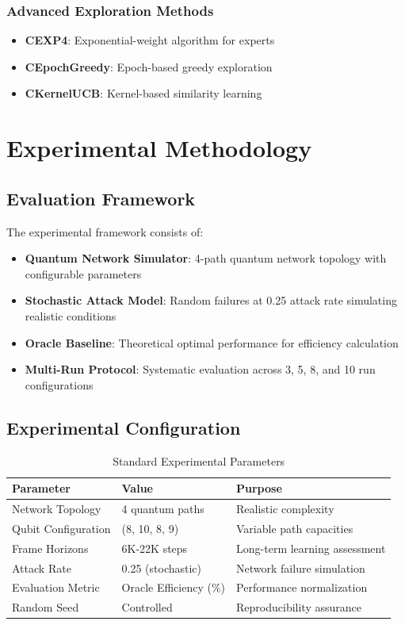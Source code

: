 \documentclass[12pt,a4paper]{article}
\begin{document}
\subsubsection{Advanced Exploration Methods}
\begin{itemize}
\item \textbf{CEXP4}: Exponential-weight algorithm for experts
\item \textbf{CEpochGreedy}: Epoch-based greedy exploration
\item \textbf{CKernelUCB}: Kernel-based similarity learning
\end{itemize}

\section{Experimental Methodology}

\subsection{Evaluation Framework}

The experimental framework consists of:

\begin{itemize}
\item \textbf{Quantum Network Simulator}: 4-path quantum network topology with configurable parameters
\item \textbf{Stochastic Attack Model}: Random failures at 0.25 attack rate simulating realistic conditions
\item \textbf{Oracle Baseline}: Theoretical optimal performance for efficiency calculation
\item \textbf{Multi-Run Protocol}: Systematic evaluation across 3, 5, 8, and 10 run configurations
\end{itemize}

\subsection{Experimental Configuration}

\begin{table}[H]
\centering
\caption{Standard Experimental Parameters}
\begin{tabular}{@{}lll@{}}
\toprule
\textbf{Parameter} & \textbf{Value} & \textbf{Purpose} \\
\midrule
Network Topology & 4 quantum paths & Realistic complexity \\
Qubit Configuration & (8, 10, 8, 9) & Variable path capacities \\
Frame Horizons & 6K-22K steps & Long-term learning assessment \\
Attack Rate & 0.25 (stochastic) & Network failure simulation \\
Evaluation Metric & Oracle Efficiency (\%) & Performance normalization \\
Random Seed & Controlled & Reproducibility assurance \\
\bottomrule
\end{tabular}
\end{table}
\end{document}
